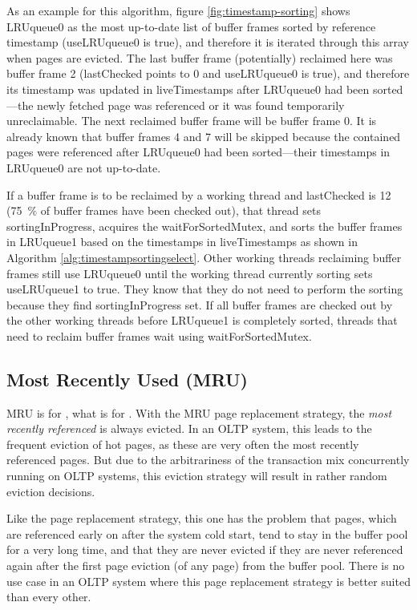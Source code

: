     As an example for this algorithm, figure \ref{fig:timestamp-sorting} shows LRUqueue0 as the most up-to-date list of buffer frames sorted by reference timestamp (useLRUqueue0 is true), and therefore it is iterated through this array when pages are evicted. The last buffer frame (potentially) reclaimed here was buffer frame 2 (lastChecked points to 0 and useLRUqueue0 is true), and therefore its timestamp was updated in liveTimestamps after LRUqueue0 had been sorted---the newly fetched page was referenced or it was found temporarily unreclaimable. The next reclaimed buffer frame will be buffer frame 0. It is already known that buffer frames 4 and 7 will be skipped because the contained pages were referenced after LRUqueue0 had been sorted---their timestamps in LRUqueue0 are not up-to-date.

    If a buffer frame is to be reclaimed by a working thread and lastChecked is 12 (\SI{75}{\percent} of buffer frames have been checked out), that thread sets sortingInProgress, acquires the waitForSortedMutex, and sorts the buffer frames in LRUqueue1 based on the timestamps in liveTimestamps as shown in Algorithm \ref{alg:timestampsortingselect}. Other working threads reclaiming buffer frames still use LRUqueue0 until the working thread currently sorting sets useLRUqueue1 to true. They know that they do not need to perform the sorting because they find sortingInProgress set. If all buffer frames are checked out by the other working threads before LRUqueue1 is completely sorted, threads that need to reclaim buffer frames wait using waitForSortedMutex.

\subsection[MRU]{Most Recently Used (MRU)} \label{subsec:mru}

    MRU is for , what  is for . With the MRU page replacement strategy, the \emph{most recently referenced} is always evicted. In an OLTP system, this leads to the frequent eviction of hot pages, as these are very often the most recently referenced pages. But due to the arbitrariness of the transaction mix concurrently running on OLTP systems, this eviction strategy will result in rather random eviction decisions.

    Like the  page replacement strategy, this one has the problem that pages, which are referenced early on after the system cold start, tend to stay in the buffer pool for a very long time, and that they are never evicted if they are never referenced again after the first page eviction (of any page) from the buffer pool. There is no use case in an OLTP system where this page replacement strategy is better suited than every other.


